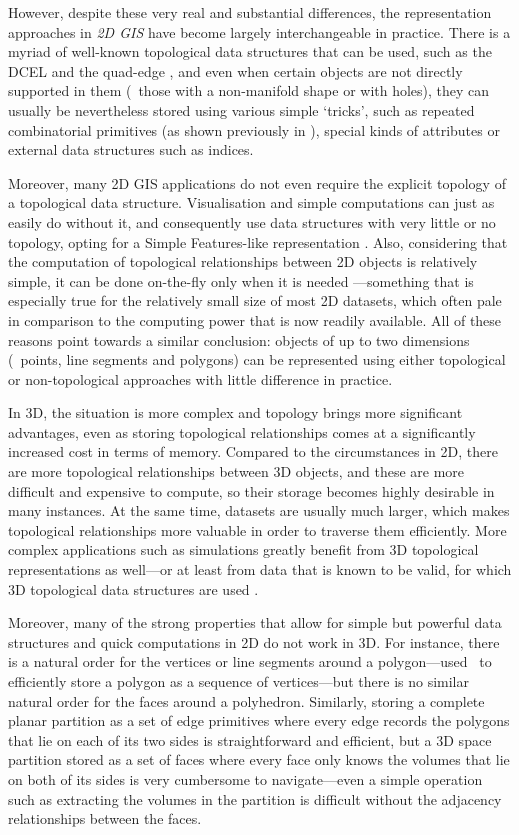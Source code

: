 However, despite these very real and substantial differences, the representation approaches in \emph{2D GIS} have become largely interchangeable in practice.
There is a myriad of well-known topological data structures that can be used, such as the DCEL \citep{Muller78} and the quad-edge \citep{Guibas85}, and even when certain objects are not directly supported in them (\eg\ those with a non-manifold shape or with holes), they can usually be nevertheless stored using various simple `tricks', such as repeated combinatorial primitives (as shown previously in ), special kinds of attributes or external data structures such as indices.

Moreover, many 2D GIS applications do not even require the explicit topology of a topological data structure.
Visualisation and simple computations can just as easily do without it, and consequently use data structures with very little or no topology, opting for a Simple Features-like representation \citep{SimpleFeatures1}.
Also, considering that the computation of topological relationships between 2D objects is relatively simple, it can be done on-the-fly only when it is needed \citep{ESRITopology}---something that is especially true for the relatively small size of most 2D datasets, which often pale in comparison to the computing power that is now readily available.
All of these reasons point towards a similar conclusion: objects of up to two dimensions (\ie\ points, line segments and polygons) can be represented using either topological or non-topological approaches with little difference in practice.

In 3D, the situation is more complex and topology brings more significant advantages, even as storing topological relationships comes at a significantly increased cost in terms of memory.
Compared to the circumstances in 2D, there are more topological relationships between 3D objects, and these are more difficult and expensive to compute, so their storage becomes highly desirable in many instances.
At the same time, datasets are usually much larger, which makes topological relationships more valuable in order to traverse them efficiently.
More complex applications such as simulations greatly benefit from 3D topological representations as well---or at least from data that is known to be valid, for which 3D topological data structures are used \citep{Ledoux13}.

Moreover, many of the strong properties that allow for simple but powerful data structures and quick computations in 2D do not work in 3D.
For instance, there is a natural order for the vertices or line segments around a polygon---used \eg\ to efficiently store a polygon as a sequence of vertices---but there is no similar natural order for the faces around a polyhedron.
Similarly, storing a complete planar partition as a set of edge primitives where every edge records the polygons that lie on each of its two sides \citep{Peucker75} is straightforward and efficient, but a 3D space partition stored as a set of faces where every face only knows the volumes that lie on both of its sides is very cumbersome to navigate---even a simple operation such as extracting the volumes in the partition is difficult without the adjacency relationships between the faces.


